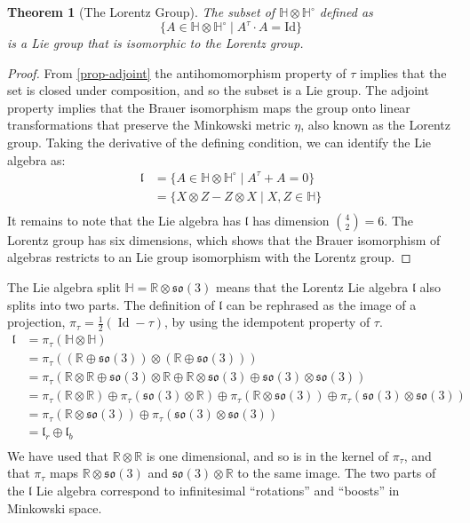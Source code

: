 \documentclass{article}
\newcommand{\HH}{\mathbb{H}}
\newcommand{\RR}{\mathbb{R}}
\newcommand{\so}{\mathfrak{so}}
\newcommand{\lorentz}{\mathfrak{l}}
\newcommand{\Id}{\operatorname{Id}}
\newtheorem{theorem}{Theorem}
\begin{document}
\begin{theorem}[The Lorentz Group]
  The subset of $ \HH\otimes \HH^\circ$ defined as
  $$ \{ A \in \HH\otimes\HH^\circ \mid A^\tau \cdot A = \mathrm{Id} \} $$
  is a Lie group that is isomorphic to the Lorentz group.
\end{theorem}

\begin{proof}
From \ref{prop-adjoint} the antihomomorphism property of $\tau$ implies that the set is closed under composition, and so the subset is a Lie group.
The adjoint property implies that the Brauer isomorphism maps the group onto linear transformations that preserve the Minkowski metric $\eta$, also known as the Lorentz group.
Taking the derivative of the defining condition, we can identify the Lie algebra as:
  \begin{align*}
    \lorentz &= \{ A \in \HH\otimes\HH^\circ \mid A^\tau + A = 0 \} \\
     &= \{ X \otimes Z - Z\otimes X \mid X, Z \in \HH \} \\
  \end{align*}
  It remains to note that the Lie algebra has $\lorentz$ has dimension ${4 \choose 2} = 6$.
  The Lorentz group has six dimensions, which shows that the Brauer isomorphism of algebras restricts to an Lie group isomorphism with the Lorentz group.

\end{proof}

The Lie algebra split $\HH=\RR\otimes\so(3)$ means that the Lorentz Lie algebra $\lorentz$ also splits into two parts.
The definition of $\lorentz$ can be rephrased as the image of a projection, $\pi_\tau = \frac{1}{2}(\Id - \tau )$, by using the idempotent property of $\tau$.
\begin{align*}
  \lorentz &= \pi_\tau(\HH\otimes\HH) \\
  &= \pi_\tau((\RR\oplus\so(3))\otimes(\RR\oplus\so(3))) \\
  &= \pi_\tau(\RR\otimes\RR \oplus \so(3)\otimes\RR \oplus \RR\otimes\so(3) \oplus \so(3)\otimes\so(3)) \\
  &= \pi_\tau(\RR\otimes\RR) \oplus \pi_\tau(\so(3)\otimes\RR) \oplus \pi_\tau(\RR\otimes\so(3)) \oplus \pi_\tau(\so(3)\otimes\so(3)) \\
  &= \pi_\tau(\RR\otimes\so(3)) \oplus \pi_\tau(\so(3)\otimes\so(3)) \\
  &= \lorentz_r \oplus \lorentz_b \\
\end{align*}
We have used that $\RR\otimes\RR$ is one dimensional, and so is in the kernel of $\pi_\tau$, and that $\pi_\tau$ maps $\RR\otimes\so(3)$ and $\so(3)\otimes\RR$ to the same image.
The two parts of the $\lorentz$ Lie algebra correspond to infinitesimal ``rotations'' and ``boosts'' in Minkowski space.
\end{document}
